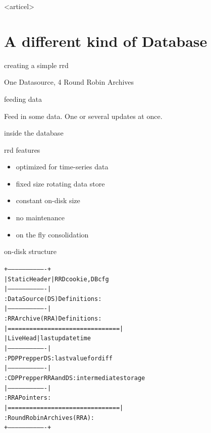 \mode<articel>{\tableofcontents}

\section{A different kind of Database}

\begin{frame}{creating a simple rrd}

One Datasource, 4 Round Robin Archives
\end{frame}

\begin{frame}{feeding data}

Feed in some data. One or several updates at once.
\end{frame}

\begin{frame}[allowframebreaks]{inside the database}

\end{frame}


\begin{frame}{rrd features}
\begin{itemize}
\item optimized for time-series data
\item fixed size rotating data store
\item constant on-disk size
\item no maintenance
\item on the fly consolidation
\end{itemize}
\end{frame}

\begin{frame}[fragile]{on-disk structure}
\begin{alltt}
+-------------------------------+
| Static Header                 | \textrm{RRD cookie, DB cfg}
|-------------------------------|\pause 
: Data Source (DS) Definitions  : 
|-------------------------------|\pause
: RR Archive (RRA) Definitions  : 
|===============================|\pause
| Live Head                     | \textrm{last update time}
|-------------------------------|\pause 
: PDP Prep per DS               : \textrm{last value for diff}
|-------------------------------|\pause
: CDP Prep per RRA and DS       : \textrm{intermediate storage}
|-------------------------------|\pause
: RRA Pointers                  :
|===============================|\pause
: Round Robin Archives (RRA)    :
+-------------------------------+
\end{alltt}
\end{frame}

